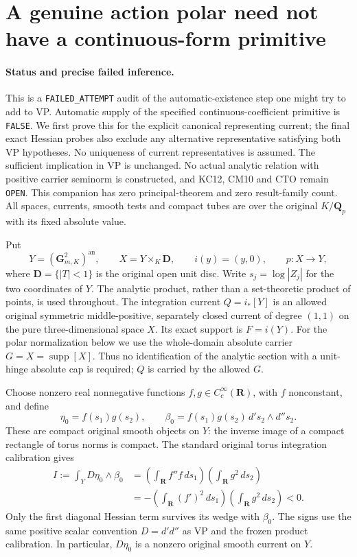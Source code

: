 \section{A genuine action polar need not have a continuous-form primitive}
\label{sec:r24-divisor-polar-primitive-obstruction}

\paragraph{Status and precise failed inference.}
This is a \texttt{FAILED\_ATTEMPT} audit of the automatic-existence
step one might try to add to VP. Automatic supply of the specified
continuous-coefficient primitive is \texttt{FALSE}. We first prove
this for the explicit canonical representing current; the final
exact Hessian probes also exclude any alternative representative
satisfying both VP hypotheses. No uniqueness of current
representatives is assumed. The sufficient implication in VP
is unchanged.
No actual analytic relation with positive carrier seminorm is
constructed, and KC12, CM10 and CTO remain \texttt{OPEN}. This
companion has zero principal-theorem and zero result-family count.
All spaces, currents, smooth tests and compact tubes are over the
original \(K/\mathbf Q_p\) with its fixed absolute value.

Put
\[
 Y=(\mathbf G_{m,K}^2)^{\mathrm{an}},\qquad
 X=Y\times_K\mathbf D,\qquad
 i(y)=(y,0),\qquad p:X\longrightarrow Y,
 \tag{VE24.1}
\]
where \(\mathbf D=\{|T|<1\}\) is the original open unit disc.
Write \(s_j=\log|Z_j|\) for the two coordinates of \(Y\).
The analytic product, rather than a set-theoretic product of points,
is used throughout. The integration current
\(Q=i_*[Y]\) is an allowed original symmetric middle-positive,
separately closed current of degree \((1,1)\) on the pure
three-dimensional space \(X\). Its exact support is
\(F=i(Y)\). For the polar normalization below we use the
whole-domain absolute carrier \(G=X=\operatorname{supp}[X]\).
Thus no identification of the analytic section with a unit-hinge
absolute cap is required; \(Q\) is carried by the allowed \(G\).

Choose nonzero real nonnegative functions \(f,g\in C_c^\infty(\mathbf R)\),
with \(f\) nonconstant, and define
\[
 \eta_0=f(s_1)g(s_2),\qquad
 \beta_0=f(s_1)g(s_2)\,d's_2\wedge d''s_2.
 \tag{VE24.2}
\]
These are compact original smooth objects on \(Y\): the inverse
image of a compact rectangle of torus norms is compact. The standard
original torus integration calibration gives
\[
 \begin{split}
 I:=\int_Y D\eta_0\wedge\beta_0
 &=\left(\int_{\mathbf R}f''f\,ds_1\right)
        \left(\int_{\mathbf R}g^2\,ds_2\right)\\
 &=-\left(\int_{\mathbf R}(f')^2\,ds_1\right)
        \left(\int_{\mathbf R}g^2\,ds_2\right)<0.
 \end{split}
 \tag{VE24.3}
\]
Only the first diagonal Hessian term survives its wedge with
\(\beta_0\). The signs use the same positive scalar convention
\(D=d'd''\) as VP and the frozen product calibration. In particular,
\(D\eta_0\) is a nonzero original smooth current on \(Y\).

